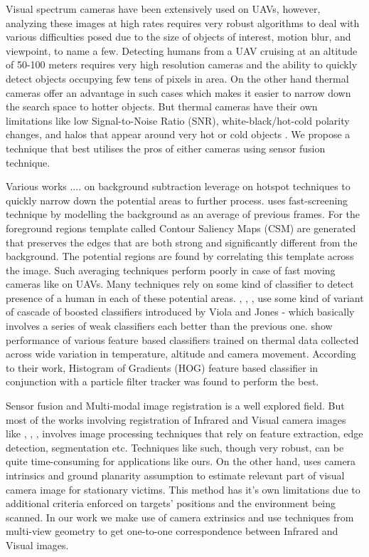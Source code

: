 \documentclass[runningheads]{llncs}
\begin{document}
Visual spectrum cameras have been extensively used on UAVs, however, analyzing these images at high rates requires very robust algorithms to deal with various difficulties posed due to the size of objects of interest, motion blur, and viewpoint, to name a few. Detecting humans from a UAV cruising at an altitude of 50-100 meters requires very high resolution cameras and the ability to quickly detect objects occupying few tens of pixels in area. On the other hand thermal cameras offer an advantage in such cases which makes it easier to narrow down the search space to hotter objects. But thermal cameras have their own limitations like low Signal-to-Noise Ratio (SNR), white-black/hot-cold polarity changes, and halos that appear around very hot or cold objects \cite{wang2010improved}. We propose a technique that best utilises the pros of either cameras using sensor fusion technique.

Various works .... on background subtraction leverage on hotspot techniques to quickly narrow down the potential areas to further process. \cite{davis2005two} uses fast-screening technique by modelling the background as an average of previous frames. For the foreground regions template called Contour Saliency Maps (CSM) are generated that preserves the edges that are both strong and significantly different from the background. The potential regions are found by correlating this template across the image. Such averaging techniques perform poorly in case of fast moving cameras like on UAVs. Many techniques rely on some kind of classifier to detect presence of a human in each of these potential areas. \cite{davis2005two}, \cite{1545530}, \cite{rudol2008human}, \cite{wang2010improved} use some kind of variant of cascade of boosted classifiers introduced by Viola and Jones \cite{viola2001rapid} - which basically involves a series of weak classifiers each better than the previous one. \cite{portmann2014people} show performance of various feature based classifiers trained on thermal data collected across wide variation in temperature, altitude and camera movement. According to their work, Histogram of Gradients (HOG) feature based classifier in conjunction with a particle filter tracker was found to perform the best.

Sensor fusion and Multi-modal image registration is a well explored field. But most of the works involving registration of Infrared and Visual camera images like \cite{doi:10.1117/12.7977034}, \cite{1384918}, \cite{4381164}, \cite{3911} involves image processing techniques that rely on feature extraction, edge detection, segmentation etc. Techniques like such, though very robust, can be quite time-consuming for applications like ours. On the other hand, \cite{rudol2008human} uses camera intrinsics and ground planarity assumption to estimate relevant part of visual camera image for stationary victims. This method has it's own limitations due to additional criteria enforced on targets' positions and the environment being scanned. In our work we make use of camera extrinsics and use techniques from multi-view geometry to get one-to-one correspondence between Infrared and Visual images.
\end{document}
